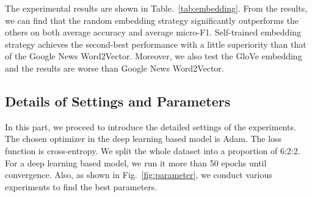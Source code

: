 The experimental results are shown in Table.~\ref{tab:embedding}. From the results, we can find that the random embedding strategy significantly outperforms the others on both average accuracy and average micro-F1. Self-trained embedding strategy achieves the second-best performance with a little superiority than that of the Google News Word2Vector. Moreover, we also test the GloVe embedding and the results are worse than Google News Word2Vector.

\begin{table}[htbp]
	\caption{Results of Different Embedding Strategies}
	\centering
	\label{tab:embedding}
\end{table}

\subsection{Details of Settings and Parameters}
In this part, we proceed to introduce the detailed settings of the experiments. The chosen optimizer in the deep learning based model is Adam. The loss function is cross-entropy. We split the whole dataset into a proportion of 6:2:2. For a deep learning based model, we  run it more than 50 epochs until convergence. Also, as shown in Fig.~\ref{fig:parameter}, we conduct various experiments to find the best parameters.

